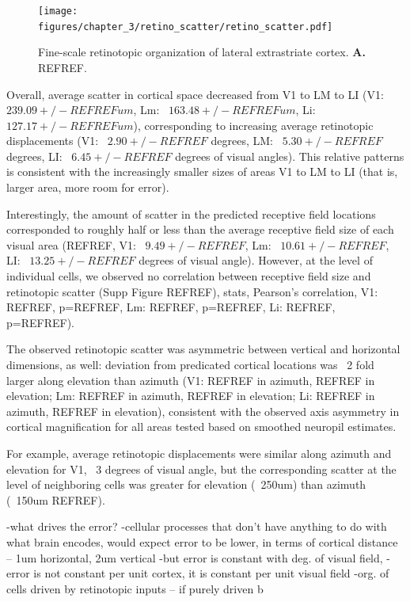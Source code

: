 \begin{figure}[t!]
    \texttt{[image: figures/chapter\_3/retino\_scatter/retino\_scatter.pdf]}
    \vspace{.1in}
    \caption[Fine-scale retinotopic organization]{Fine-scale retinotopic organization of lateral extrastriate cortex. \textbf{A.} REFREF.
    \label{fig:retino_scatter}}
\end{figure}

Overall, average scatter in cortical space decreased from V1 to LM to LI (V1: ~$239.09+/-REFREFum$, Lm: ~$163.48+/-REFREFum$, Li: ~$127.17+/-REFREFum$), corresponding to increasing average retinotopic displacements (V1: ~$2.90+/-REFREF$ degrees, LM: ~$5.30+/-REFREF$ degrees, LI: ~$6.45+/-REFREF$ degrees of visual angles). This relative patterns is consistent with the increasingly smaller sizes of areas V1 to LM to LI (that is, larger area, more room for error). 

Interestingly, the amount of scatter in the predicted receptive field locations corresponded to roughly half or less than the average receptive field size of each visual area (REFREF, V1: ~$9.49+/-REFREF$, Lm: ~$10.61+/-REFREF$, LI: ~$13.25+/-REFREF$ degrees of visual angle). However, at the level of individual cells, we observed no correlation between receptive field size and retinotopic scatter (Supp Figure REFREF), stats, Pearson’s correlation, V1: REFREF, p=REFREF, Lm: REFREF, p=REFREF, Li: REFREF, p=REFREF).

The observed retinotopic scatter was asymmetric between vertical and horizontal dimensions, as well:  deviation from predicated cortical locations was ~2 fold larger along elevation than azimuth (V1: REFREF in azimuth, REFREF in elevation; Lm: REFREF in azimuth, REFREF in elevation; Li: REFREF in azimuth, REFREF in elevation), consistent with the observed axis asymmetry in cortical magnification for all areas tested based on smoothed neuropil estimates. 


For example, average retinotopic displacements were similar along azimuth and elevation for V1, ~3 degrees of visual angle, but the corresponding scatter at the level of neighboring cells was greater for elevation (~250um) than azimuth (~150um REFREF). 

-what drives the error?
-cellular processes that don't have anything to do with what brain encodes, would expect error to be lower, in terms of cortical distance -- 1um horizontal, 2um vertical
-but error is constant with deg. of visual field, 
-error is not constant per unit cortex, it is constant per unit visual field
-org. of cells driven by retinotopic inputs -- if purely driven b

